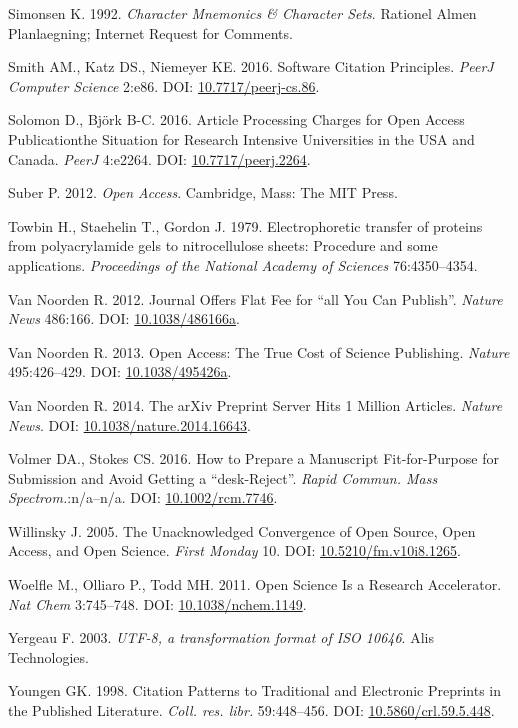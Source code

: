 \documentclass[10pt,fleqn]{wlpeerj}
\begin{document}
\hypertarget{ref-rfc1345}{}
Simonsen K. 1992. \emph{Character Mnemonics \& Character Sets}. Rationel
Almen Planlaegning; Internet Request for Comments.

\hypertarget{ref-smithux5fsoftwareux5f2016}{}
Smith AM., Katz DS., Niemeyer KE. 2016. Software Citation Principles.
\emph{PeerJ Computer Science} 2:e86. DOI:
\href{https://doi.org/10.7717/peerj-cs.86}{10.7717/peerj-cs.86}.

\hypertarget{ref-solomonux5farticleux5f2016}{}
Solomon D., Björk B-C. 2016. Article Processing Charges for Open Access
Publicationthe Situation for Research Intensive Universities in the USA
and Canada. \emph{PeerJ} 4:e2264. DOI:
\href{https://doi.org/10.7717/peerj.2264}{10.7717/peerj.2264}.

\hypertarget{ref-suberux5fopenux5f2012}{}
Suber P. 2012. \emph{Open Access}. Cambridge, Mass: The MIT Press.

\hypertarget{ref-towbinux5felectrophoreticux5f1979}{}
Towbin H., Staehelin T., Gordon J. 1979. Electrophoretic transfer of
proteins from polyacrylamide gels to nitrocellulose sheets: Procedure
and some applications. \emph{Proceedings of the National Academy of
Sciences} 76:4350--4354.

\hypertarget{ref-vanux5fnoordenux5fjournalux5f2012}{}
Van Noorden R. 2012. Journal Offers Flat Fee for ``all You Can
Publish''. \emph{Nature News} 486:166. DOI:
\href{https://doi.org/10.1038/486166a}{10.1038/486166a}.

\hypertarget{ref-vanux5fnoordenux5fopenux5f2013}{}
Van Noorden R. 2013. Open Access: The True Cost of Science Publishing.
\emph{Nature} 495:426--429. DOI:
\href{https://doi.org/10.1038/495426a}{10.1038/495426a}.

\hypertarget{ref-vanux5fnoordenux5farxivux5f2014}{}
Van Noorden R. 2014. The arXiv Preprint Server Hits 1 Million Articles.
\emph{Nature News}. DOI:
\href{https://doi.org/10.1038/nature.2014.16643}{10.1038/nature.2014.16643}.

\hypertarget{ref-volmerux5fhowux5f2016}{}
Volmer DA., Stokes CS. 2016. How to Prepare a Manuscript Fit-for-Purpose
for Submission and Avoid Getting a ``desk-Reject''. \emph{Rapid Commun.
Mass Spectrom.}:n/a--n/a. DOI:
\href{https://doi.org/10.1002/rcm.7746}{10.1002/rcm.7746}.

\hypertarget{ref-willinskyux5funacknowledgedux5f2005}{}
Willinsky J. 2005. The Unacknowledged Convergence of Open Source, Open
Access, and Open Science. \emph{First Monday} 10. DOI:
\href{https://doi.org/10.5210/fm.v10i8.1265}{10.5210/fm.v10i8.1265}.

\hypertarget{ref-woelfleux5fopenux5f2011}{}
Woelfle M., Olliaro P., Todd MH. 2011. Open Science Is a Research
Accelerator. \emph{Nat Chem} 3:745--748. DOI:
\href{https://doi.org/10.1038/nchem.1149}{10.1038/nchem.1149}.

\hypertarget{ref-rfc3629}{}
Yergeau F. 2003. \emph{UTF-8, a transformation format of ISO 10646}.
Alis Technologies.

\hypertarget{ref-youngenux5fcitationux5f1998}{}
Youngen GK. 1998. Citation Patterns to Traditional and Electronic
Preprints in the Published Literature. \emph{Coll. res. libr.}
59:448--456. DOI:
\href{https://doi.org/10.5860/crl.59.5.448}{10.5860/crl.59.5.448}.
\end{document}
